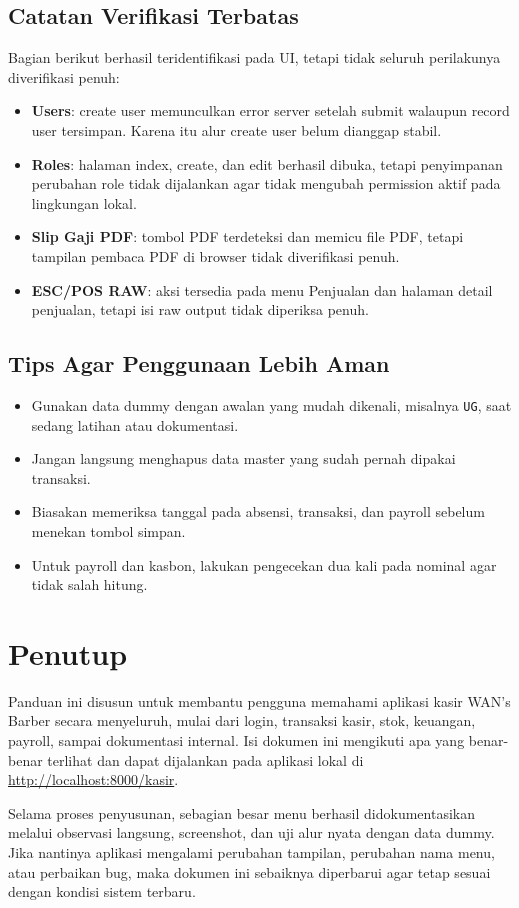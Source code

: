 \documentclass[12pt,a4paper]{article}
\begin{document}
\subsection{Catatan Verifikasi Terbatas}
Bagian berikut berhasil teridentifikasi pada UI, tetapi tidak seluruh perilakunya diverifikasi penuh:
\begin{itemize}
    \item \textbf{Users}: create user memunculkan error server setelah submit walaupun record user tersimpan. Karena itu alur create user belum dianggap stabil.
    \item \textbf{Roles}: halaman index, create, dan edit berhasil dibuka, tetapi penyimpanan perubahan role tidak dijalankan agar tidak mengubah permission aktif pada lingkungan lokal.
    \item \textbf{Slip Gaji PDF}: tombol PDF terdeteksi dan memicu file PDF, tetapi tampilan pembaca PDF di browser tidak diverifikasi penuh.
    \item \textbf{ESC/POS RAW}: aksi tersedia pada menu Penjualan dan halaman detail penjualan, tetapi isi raw output tidak diperiksa penuh.
\end{itemize}

\subsection{Tips Agar Penggunaan Lebih Aman}
\begin{itemize}
    \item Gunakan data dummy dengan awalan yang mudah dikenali, misalnya \texttt{UG}, saat sedang latihan atau dokumentasi.
    \item Jangan langsung menghapus data master yang sudah pernah dipakai transaksi.
    \item Biasakan memeriksa tanggal pada absensi, transaksi, dan payroll sebelum menekan tombol simpan.
    \item Untuk payroll dan kasbon, lakukan pengecekan dua kali pada nominal agar tidak salah hitung.
\end{itemize}

\section{Penutup}
Panduan ini disusun untuk membantu pengguna memahami aplikasi kasir WAN's Barber secara menyeluruh, mulai dari login, transaksi kasir, stok, keuangan, payroll, sampai dokumentasi internal. Isi dokumen ini mengikuti apa yang benar-benar terlihat dan dapat dijalankan pada aplikasi lokal di \url{http://localhost:8000/kasir}.

Selama proses penyusunan, sebagian besar menu berhasil didokumentasikan melalui observasi langsung, screenshot, dan uji alur nyata dengan data dummy. Jika nantinya aplikasi mengalami perubahan tampilan, perubahan nama menu, atau perbaikan bug, maka dokumen ini sebaiknya diperbarui agar tetap sesuai dengan kondisi sistem terbaru.
\end{document}

